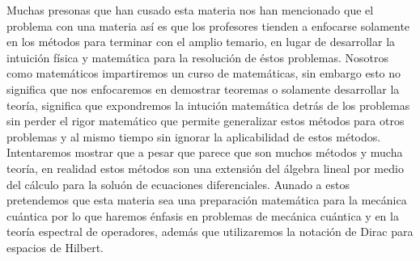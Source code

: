 \documentclass[letterpaper]{book}
\begin{document}
Muchas presonas que han cusado esta materia nos han mencionado que el problema con una materia así es que los profesores tienden a enfocarse solamente en los métodos para terminar con el amplio temario, en lugar de desarrollar la intuición física y matemática para la resolución de éstos problemas. Nosotros como matemáticos impartiremos un curso de matemáticas, sin embargo esto no significa que nos enfocaremos en demostrar teoremas o solamente desarrollar la teoría, significa que expondremos la intución matemática detrás de los problemas sin perder el rigor matemático que permite generalizar estos métodos para otros problemas y al mismo tiempo sin ignorar la aplicabilidad de estos métodos. Intentaremos mostrar que a pesar que parece que son muchos métodos y mucha teoría, en realidad estos métodos son una extensión del álgebra lineal por medio del cálculo para la soluón de ecuaciones diferenciales. Aunado a estos pretendemos que esta materia sea una preparación matemática para la mecánica cuántica por lo que haremos énfasis en problemas de mecánica cuántica y en la teoría espectral de operadores, además que utilizaremos la notación de Dirac para espacios de Hilbert.\\
\end{document}
